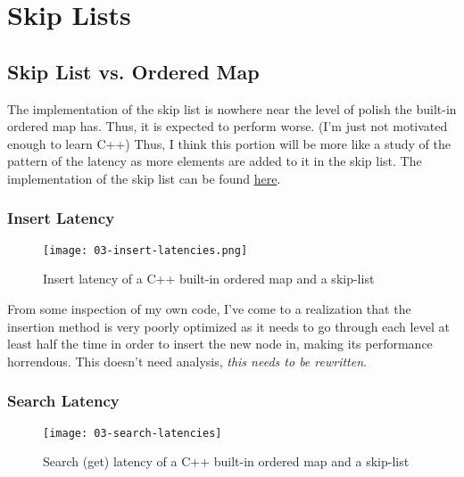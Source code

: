 \section{Skip Lists}

\subsection{Skip List vs. Ordered Map}

\begin{tcolorbox}[title=Disclaimer]
	The implementation of the skip list is nowhere near the level of polish the built-in ordered map has. Thus, it is expected to perform worse. (I'm just not motivated enough to learn C++) Thus, I think this portion will be more like a study of the pattern of the latency as more elements are added to it in the skip list. The implementation of the skip list can be found \href{https://github.com/nngerncham/cs315_apal/tree/main/assignments/asn01/03-skip-list}{here}.
\end{tcolorbox}

\subsubsection{Insert Latency}
\begin{figure}[H]
	\begin{center}
		\texttt{[image: 03-insert-latencies.png]}
		\caption{Insert latency of a C++ built-in ordered map and a skip-list}
		\label{fig:03-insert-latency}
	\end{center}
\end{figure}

From some inspection of my own code, I've come to a realization that the insertion method is very poorly optimized as it needs to go through each level at least half the time in order to insert the new node in, making its performance horrendous. This doesn't need analysis, \textit{this needs to be rewritten}.

\begingroup

\subsubsection{Search Latency}
\begin{figure}[H]
	\begin{center}
		\texttt{[image: 03-search-latencies]}
		\caption{Search (get) latency of a C++ built-in ordered map and a skip-list}
		\label{fig:03-search-latency}
	\end{center}
\end{figure}

